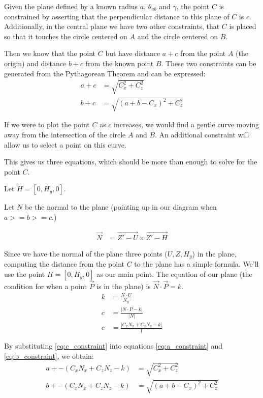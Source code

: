 \documentclass{article}
\begin{document}
\newcommand{\abs}[1]{ \left\lvert#1\right\rvert}

Given the plane defined by a known radius $a$, $\theta_{ab}$ and $\gamma$,
the point $C$ is constrained by asserting that the perpendicular
distance to this plane of $C$ is $c$.
Additionally, in the central plane we have two other constraints,
that $C$ is placed so that it touches the circle centered on $A$ and
the circle centered on $B$.

Then we know that the point $C$ but have distance $a+c$ from
the point $A$ (the origin) and distance $b+c$ from the known
point $B$. These two constraints can be generated from the Pythagorean Theorem and can be expressed:
\begin{align}
a + c &= \sqrt{C_x^2 + C_z ^2} \label{eq:a_constraint}\\
b + c &= \sqrt{(a+b-C_x)^2 + C_z^2} \label{eq:b_constraint}
\end{align}

If we were to plot the point $C$ as $c$ increases, we
would find a gentle curve moving away from the intersection
of the circle $A$ and $B$. An additional constraint will
allow us to select a point on this curve.

This gives us three equations, which
should be more than enough to solve for the point $C$.

Let $H = [0, H_y,0]$.

Let $N$ be the normal to the plane (pointing up in our diagram
when $ a >= b >= c $.)

\begin{align}
\overrightarrow{N} &= \overrightarrow{Z' - U}  \times \overrightarrow{Z' - H}
\end{align}

Since we have the normal of the plane three points ($U,Z,H_y$) in the plane,
computing the distance from the point $C$ to the plane has a simple
formula. We'll use the point $H = [0, H_y, 0]$ as our main point.
The equation of our plane (the condition for when a point $\overrightarrow{P}$ is in the plane) is
$ \overrightarrow{N} \cdot \overrightarrow{P} = k$.
\begin{align}
k &= \frac{N \cdot U}{N_y} \\
c &= \frac{\abs{N \cdot P - k}}{\abs{N}} \\
c &= \frac{\abs{C_x  N_x  + C_z  N_z - k}}{1} \label{eq:c_constraint}
\end{align}

By substituting \ref{eq:c_constraint} into equations
\ref{eq:a_constraint} and \ref{eq:b_constraint},
we obtain:
\begin{align}
a +  -(C_x N_x + C_z N_z - k) &= \sqrt{C_x^2 + C_z ^2} \\
b +  -(C_x N_x + C_z N_z - k) &= \sqrt{(a+b-C_x)^2 + C_z^2}
\end{align}
\end{document}
